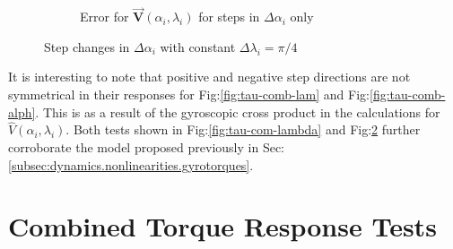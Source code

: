 \begin{figure}[htbp]
\begin{subfigure}{0.49\textwidth}
\caption{Error for $\vec{\mathbf{V}}(\alpha_i,\lambda_i)$ for steps in $\Delta\alpha_i$ only}
\label{fig:tau-comb-alph-r}
\end{subfigure}
\vspace{-6pt}
\caption{Step changes in $\Delta\alpha_i$ with constant $\Delta\lambda_i=\pi/4$}
\label{fig:tau-comb-alpha}
\vspace{-16pt}
\end{figure}
\par
It is interesting to note that positive and negative step directions are not symmetrical in their responses for Fig:\ref{fig:tau-comb-lam} and Fig:\ref{fig:tau-comb-alph}. This is as a result of the gyroscopic cross product in the calculations for $\hat{V}(\alpha_i,\lambda_i)$. Both tests shown in Fig:\ref{fig:tau-com-lambda} and Fig:\ref{fig:tau-comb-alpha} further corroborate the model proposed previously in Sec:\ref{subsec:dynamics.nonlinearities.gyrotorques}.
\newpage
\section{Combined Torque Response Tests}
\label{app:tau-comb-test}
\newpage
